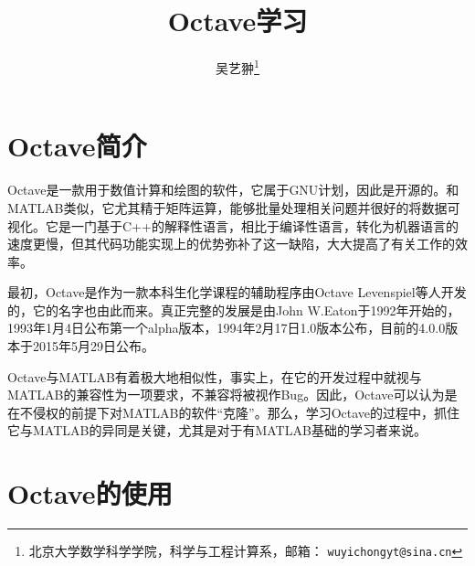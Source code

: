 \documentclass[a4paper,11pt]{ctexart}
\title{Octave学习}
\author{吴艺翀\quad1601110035\thanks{北京大学数学科学学院，科学与工程计算系，邮箱： {\tt wuyichongyt@sina.cn}}}
\begin{document}
\maketitle
\tableofcontents
\newpage
\section{Octave简介}
Octave是一款用于数值计算和绘图的软件，它属于GNU计划，因此是开源的。和MATLAB类似，它尤其精于矩阵运算，能够批量处理相关问题并很好的将数据可视化。它是一门基于C++的解释性语言，相比于编译性语言，转化为机器语言的速度更慢，但其代码功能实现上的优势弥补了这一缺陷，大大提高了有关工作的效率。\par
最初，Octave是作为一款本科生化学课程的辅助程序由Octave Levenspiel等人开发的，它的名字也由此而来。真正完整的发展是由John W.Eaton于1992年开始的，1993年1月4日公布第一个alpha版本，1994年2月17日1.0版本公布，目前的4.0.0版本于2015年5月29日公布。\par
Octave与MATLAB有着极大地相似性，事实上，在它的开发过程中就视与MATLAB的兼容性为一项要求，不兼容将被视作Bug。因此，Octave可以认为是在不侵权的前提下对MATLAB的软件“克隆”。那么，学习Octave的过程中，抓住它与MATLAB的异同是关键，尤其是对于有MATLAB基础的学习者来说。
\section{Octave的使用}
\end{document}
